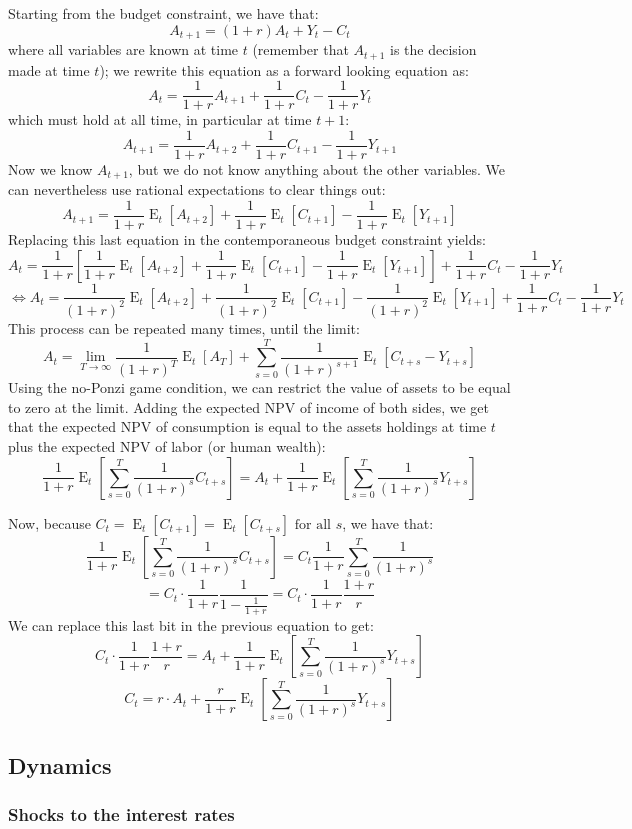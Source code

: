 \documentclass[12pt]{report}
\newcommand{\Et}[1]{\operatorname{E}_t\left[#1\right]}
\begin{document}
Starting from the budget constraint, we have that: $$A_{t+1} = (1+r)A_t + Y_t - C_t $$ where all variables are known at time $t$ (remember that $A_{t+1}$ is the decision made at time $t$); we rewrite this equation as a forward looking equation as: $$A_t = \frac{1}{1+r}A_{t+1} + \frac{1}{1+r}C_t - \frac{1}{1+r}Y_t $$ which must hold at all time, in particular at time $t+1$: $$A_{t+1} = \frac{1}{1+r}A_{t+2} + \frac{1}{1+r}C_{t+1} - \frac{1}{1+r}Y_{t+1} $$ Now we know $A_{t+1}$, but we do not know anything about the other variables. We can nevertheless use rational expectations to clear things out: $$A_{t+1} = \frac{1}{1+r}\Et{A_{t+2}} + \frac{1}{1+r}\Et{C_{t+1}} - \frac{1}{1+r}\Et{Y_{t+1}} $$ Replacing this last equation in the contemporaneous budget constraint yields: $$A_t = \frac{1}{1+r}\left[\frac{1}{1+r}\Et{A_{t+2}} + \frac{1}{1+r}\Et{C_{t+1}} - \frac{1}{1+r}\Et{Y_{t+1}}\right] + \frac{1}{1+r}C_t - \frac{1}{1+r}Y_t $$ $$\Leftrightarrow A_t = \frac{1}{(1+r)^2}\Et{A_{t+2}} + \frac{1}{(1+r)^2}\Et{C_{t+1}} - \frac{1}{(1+r)^2}\Et{Y_{t+1}} + \frac{1}{1+r}C_t - \frac{1}{1+r}Y_t $$ This process can be repeated many times, until the limit: $$A_t = \lim_{T\to\infty} \frac{1}{(1+r)^T}\Et{A_T} + \sum_{s=0}^{T} \frac{1}{(1+r)^{s+1}}\Et{C_{t+s} - Y_{t+s}} $$ Using the no-Ponzi game condition, we can restrict the value of assets to be equal to zero at the limit. Adding the expected NPV of income of both sides, we get that the expected NPV of consumption is equal to the assets holdings at time $t$ plus the expected NPV of labor (or human wealth): $$ \frac{1}{1+r} \Et{\sum_{s=0}^{T} \frac{1}{(1+r)^{s}}C_{t+s}} = A_t + \frac{1}{1+r} \Et{\sum_{s=0}^{T} \frac{1}{(1+r)^{s}}Y_{t+s}}  $$

Now, because $C_t = \Et{C_{t+1}} = \Et{C_{t+s}} \text{ for all } s$, we have that: $$ \frac{1}{1+r} \Et{\sum_{s=0}^{T} \frac{1}{(1+r)^{s}}C_{t+s}} = C_{t}\frac{1}{1+r} \sum_{s=0}^{T} \frac{1}{(1+r)^{s}} $$ $$ = C_{t}\cdot \frac{1}{1+r} \frac{1}{1 - \frac{1}{1+r}} = C_{t}\cdot \frac{1}{1+r} \frac{1+r}{r} $$ We can replace this last bit in the previous equation to get: $$C_{t}\cdot \frac{1}{1+r} \frac{1+r}{r} = A_t + \frac{1}{1+r} \Et{\sum_{s=0}^{T} \frac{1}{(1+r)^{s}}Y_{t+s}} $$ $$ C_{t} = r \cdot A_t + \frac{r}{1+r} \Et{\sum_{s=0}^{T} \frac{1}{(1+r)^{s}}Y_{t+s}} $$

\subsection{Dynamics}

\subsubsection{Shocks to the interest rates}
\end{document}
